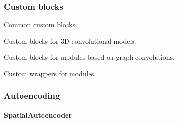 \documentclass[letterpaper,10pt,english]{sphinxmanual}
\begin{document}
\subsubsection{Custom blocks}
\label{\detokenize{api/custom_blocks:module-geology.metamodelling.common}}\label{\detokenize{api/custom_blocks:custom-blocks}}\label{\detokenize{api/custom_blocks::doc}}
Common custom blocks.

\label{\detokenize{api/custom_blocks:module-geology.metamodelling.conv_3d}}
Custom blocks for 3D convolutional models.

\label{\detokenize{api/custom_blocks:module-geology.metamodelling.graph}}
Custom blocks for modules based on graph convolutions.

\label{\detokenize{api/custom_blocks:module-geology.metamodelling.wrappers}}
Custom wrappers for modules.


\subsubsection{Autoencoding}
\label{\detokenize{api/autoencoding:autoencoding}}\label{\detokenize{api/autoencoding::doc}}

\paragraph{SpatialAutoencoder}
\label{\detokenize{api/autoencoding:spatialautoencoder}}
\end{document}
